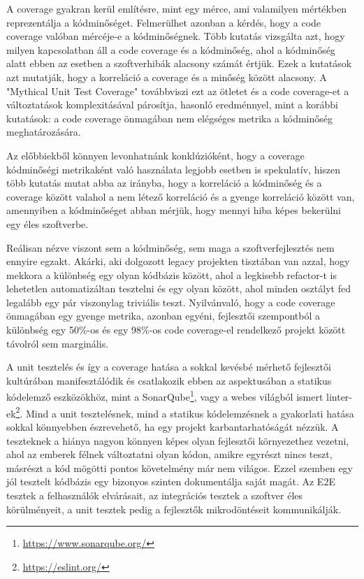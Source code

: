 A coverage gyakran kerül említésre, mint egy mérce, ami valamilyen mértékben reprezentálja a kódminőséget. Felmerülhet azonban a kérdés, hogy a code coverage valóban mércéje-e a kódminőségnek. Több kutatás \cite{onRelation}\cite{singhkochhar:hal-01653728} vizsgálta azt, hogy milyen kapcsolatban áll a code coverage és a kódminőség, ahol a kódminőség alatt ebben az esetben a szoftverhibák alacsony számát értjük. Ezek a kutatások azt mutatják, hogy a korreláció a coverage és a minőség között alacsony. A "Mythical Unit Test Coverage"\cite{mythical} továbbviszi ezt az ötletet és a code coverage-et a változtatások komplexitásával párosítja, hasonló eredménnyel, mint a korábbi kutatások: a code coverage önmagában nem elégséges metrika a kódminőség meghatározására.

Az előbbiekből könnyen levonhatnánk konklúzióként, hogy a coverage kódminőségi metrikaként való használata legjobb esetben is spekulatív, hiszen több kutatás mutat abba az irányba, hogy a korreláció a kódminőség és a coverage között valahol a nem létező korreláció és a gyenge korreláció között van, amennyiben a kódminőséget abban mérjük, hogy mennyi hiba képes bekerülni egy éles szoftverbe.

Reálisan nézve viszont sem a kódminőség, sem maga a szoftverfejlesztés nem ennyire egzakt. Akárki, aki dolgozott legacy projekten tisztában van azzal, hogy mekkora a különbség egy olyan kódbázis között, ahol a legkisebb refactor-t is lehetetlen automatizáltan tesztelni és egy olyan között, ahol minden osztályt fed legalább egy pár viszonylag triviális teszt. Nyilvánvaló, hogy a code coverage önmagában egy gyenge metrika, azonban egyéni, fejlesztői szempontból a különbség egy 50\%-os és egy 98\%-os code coverage-el rendelkező projekt között távolról sem marginális.

A unit tesztelés és így a coverage hatása a sokkal kevésbé mérhető fejlesztői kultúrában manifesztálódik és csatlakozik ebben az aspektusában a statikus kódelemző eszközökhöz, mint a SonarQube\footnote{\url{https://www.sonarqube.org/}}, vagy a webes világból ismert linter-ek\footnote{\url{https://eslint.org/}}. Mind a unit tesztelésnek, mind a statikus kódelemzésnek a gyakorlati hatása sokkal könnyebben észrevehető, ha egy projekt karbantarhatóságát nézzük. A teszteknek a hiánya nagyon könnyen képes olyan fejlesztői környezethez vezetni, ahol az emberek félnek változtatni olyan kódon, amikre egyrészt nincs teszt, másrészt a kód mögötti pontos követelmény már nem világos. Ezzel szemben egy jól tesztelt kódbázis egy bizonyos szinten dokumentálja saját magát. Az E2E tesztek a felhasználók elvárásait, az integrációs tesztek a szoftver éles körülményeit, a unit tesztek pedig a fejlesztők mikrodöntéseit kommunikálják.

